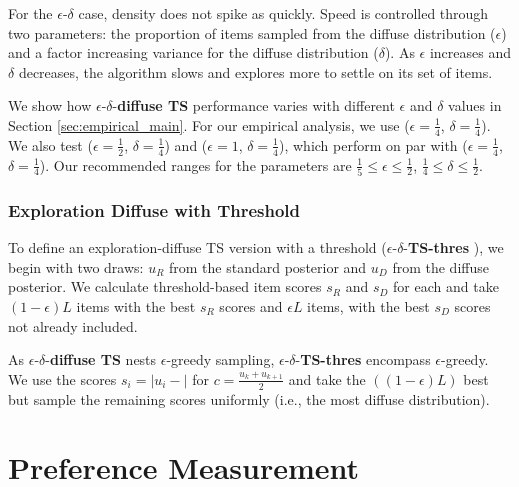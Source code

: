\documentclass[a4paper,11pt]{article}
\newcommand{\alexander}[1]{\textcolor{blue}{\textbf{(alexander)} #1}}
\newcommand{\eric}[1]{\textcolor{red}{\textbf{(eric)} #1}}
\newcommand{\edts}{$\epsilon$-$\delta$-\textbf{diffuse TS} }
\newcommand{\edtsthres}{$\epsilon$-$\delta$-\textbf{TS-thres} }
\newcommand{\numperset}{L}
\begin{document}
For the $\epsilon$-$\delta$ case, density does not spike as quickly. Speed is controlled through two parameters: the proportion of items sampled from the diffuse distribution ($\epsilon$) and a factor increasing variance for the diffuse distribution ($\delta$). As $\epsilon$ increases and $\delta$ decreases, the algorithm slows and explores more to settle on its set of items. 

We show how \edts performance varies with different $\epsilon$ and $\delta$ values in Section \ref{sec:empirical_main}.  For our empirical analysis, we use ($\epsilon=\frac{1}{4}$, $\delta=\frac{1}{4}$). We also test ($\epsilon=\frac{1}{2}$, $\delta=\frac{1}{4}$) and ($\epsilon=1$, $\delta=\frac{1}{4}$), which perform on par with ($\epsilon=\frac{1}{4}$, $\delta=\frac{1}{4}$). Our recommended ranges for the parameters are $\frac{1}{5}\leq \epsilon \leq \frac{1}{2}$, $\frac{1}{4}\leq \delta \leq \frac{1}{2}$.



\subsubsection{Exploration Diffuse with Threshold}

To define an exploration-diffuse TS version with a threshold (\edtsthres), we begin with two draws: $u_R$ from the standard posterior and $u_D$ from the diffuse posterior. We calculate threshold-based item scores $s_R$ and $s_D$ for each and take $(1- \epsilon) \numperset$ items with the best $s_R$ scores and $\epsilon \numperset$ items, with the best $s_D$ scores not already included. 

As \edts nests $\epsilon$-greedy sampling, \edtsthres encompass $\epsilon$-greedy. We use the scores $s_i=|u_i - |$ for $c=\frac{u_k+u_{k+1}}{2}$ and take the $((1-\epsilon)L)$ best but sample the remaining scores uniformly (i.e., the most diffuse distribution).

\section{Preference Measurement}
\end{document}

